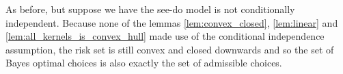 \begin{example}\label{ex:cc_nonsdt}
As before, but suppose we have the see-do model is not conditionally independent. Because none of the lemmas \ref{lem:convex_closed}, \ref{lem:linear} and \ref{lem:all_kernels_is_convex_hull} made use of the conditional independence assumption, the risk set is still convex and closed downwards and so the set of Bayes optimal choices is also exactly the set of admissible choices.
\end{example}





